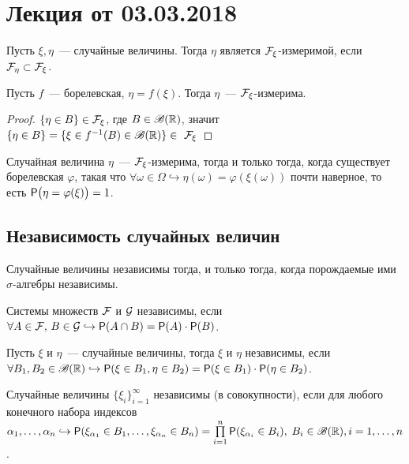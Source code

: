 \section{Лекция от 03.03.2018}
\setcounter{property}{0}

\begin{definition}
	Пусть $\xi, \eta$~--- случайные величины. Тогда $\eta$ является $\F_\xi$-измеримой, если $\F_\eta \subset \F_\xi$.
\end{definition}

\begin{example}
	Пусть $f$~--- борелевская, $\eta = f(\xi)$. Тогда $\eta$~--- $\F_\xi$-измерима.
	\begin{proof}
		$\{\eta \in B\} \in \F_\xi$, где $B \in \B(\R)$, значит $\{\eta \in B\} = \{\xi \in f^{-1}(B) \in \B(\R)\} \in~\F_\xi$
	\end{proof}
\end{example}

\begin{theorem}[][б/д]
	Случайная величина $\eta$~--- $\F_\xi$-измерима, тогда и только тогда, когда существует борелевская $\varphi$, такая что $\forall \omega \in \Omega \hookrightarrow \eta(\omega) = \varphi(\xi(\omega))$ почти наверное, то есть $\P\big(\eta = \varphi(\xi)\big) = 1$.
\end{theorem}

\subsection{Независимость случайных величин}
\begin{statement}
    Случайные величины независимы тогда, и только тогда, когда порождаемые ими $\sigma$-алгебры независимы.
\end{statement}

\begin{definition}
	Системы множеств $\F$ и $\G$ независимы, если $\forall A \in \F,\, B \in \G \hookrightarrow \P(A \cap B) = \P(A)\cdot\P(B)$.
\end{definition}

\begin{definition}
	Пусть $\xi$ и $\eta$~--- случайные величины, тогда $\xi$ и $\eta$ независимы, если $\forall B_1, B_2 \in \B(\R) \hookrightarrow  \P(\xi \in B_1, \eta \in B_2) = \P(\xi \in B_1)\cdot\P(\eta \in B_2)$.
\end{definition}

\begin{definition}
	Случайные величины $\{\xi_i\}_{i = 1}^\infty$ независимы (в совокупности), если для любого конечного набора индексов $\alpha_1, \ldots, \alpha_n \hookrightarrow \P(\xi_{\alpha_1} \in B_1, \ldots, \xi_{\alpha_n} \in B_n) = \prod\limits_{i = 1}^n\P(\xi_{\alpha_i} \in B_i),\; B_i \in \B(\R), i = 1, \ldots, n$.
\end{definition}

